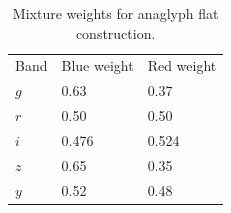 \begin{table}[]
  \begin{tabular}{lll}
    Band & Blue weight & Red weight \\
    $g$ & 0.63 & 0.37 \\
    $r$ & 0.50 & 0.50 \\
    $i$ & 0.476 & 0.524 \\
    $z$ & 0.65 & 0.35 \\
    $y$ & 0.52 & 0.48 \\
  \end{tabular}
  \label{tab:anaglyph_ratios}
  \caption{Mixture weights for anaglyph flat construction.}
\end{table}
